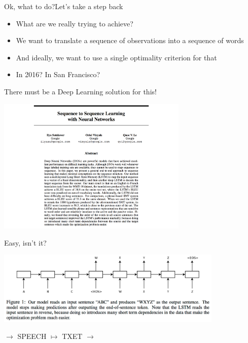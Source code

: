 \begin{frame}{Ok, what to do?}{Let's take a step back}
  \begin{itemize}
  \item What are we really trying to achieve?
  \item We want to translate a sequence of observations into a sequence of words
  \item And ideally, we want to use a single optimality criterion for that
  \item In 2016? In San Francisco?
  \end{itemize}
\end{frame}

\begin{frame}{There must be a Deep Learning solution for this!}{\cite{s2s-nips}}
  \begin{center}
    \includegraphics[height=65mm]{figures/s2s}
  \end{center}
\end{frame}

\begin{frame}{Easy, isn't it?}{\cite{s2s-nips}}
  \begin{center}
    \includegraphics[height=35mm]{figures/s2s-fig}
  \end{center}
\hspace{1.7cm} $\rightarrow$ SPEECH $\mapsto$ TXET $\rightarrow$
\end{frame}

